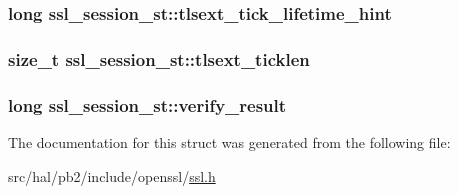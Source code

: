 \subsubsection[{\texorpdfstring{tlsext\+\_\+tick\+\_\+lifetime\+\_\+hint}{tlsext_tick_lifetime_hint}}]{\setlength{\rightskip}{0pt plus 5cm}long ssl\+\_\+session\+\_\+st\+::tlsext\+\_\+tick\+\_\+lifetime\+\_\+hint}\hypertarget{structssl__session__st_a8c4421410ed55e716ab61e143f636f24}{}\label{structssl__session__st_a8c4421410ed55e716ab61e143f636f24}
\subsubsection[{\texorpdfstring{tlsext\+\_\+ticklen}{tlsext_ticklen}}]{\setlength{\rightskip}{0pt plus 5cm}size\+\_\+t ssl\+\_\+session\+\_\+st\+::tlsext\+\_\+ticklen}\hypertarget{structssl__session__st_a8858f901b65590fa8a077c2ef6f8aef1}{}\label{structssl__session__st_a8858f901b65590fa8a077c2ef6f8aef1}
\subsubsection[{\texorpdfstring{verify\+\_\+result}{verify_result}}]{\setlength{\rightskip}{0pt plus 5cm}long ssl\+\_\+session\+\_\+st\+::verify\+\_\+result}\hypertarget{structssl__session__st_a448769f219815a3a49b726d5ab288783}{}\label{structssl__session__st_a448769f219815a3a49b726d5ab288783}


The documentation for this struct was generated from the following file\+:\begin{DoxyCompactItemize}
\item 
src/hal/pb2/include/openssl/\hyperlink{ssl_8h}{ssl.\+h}\end{DoxyCompactItemize}
